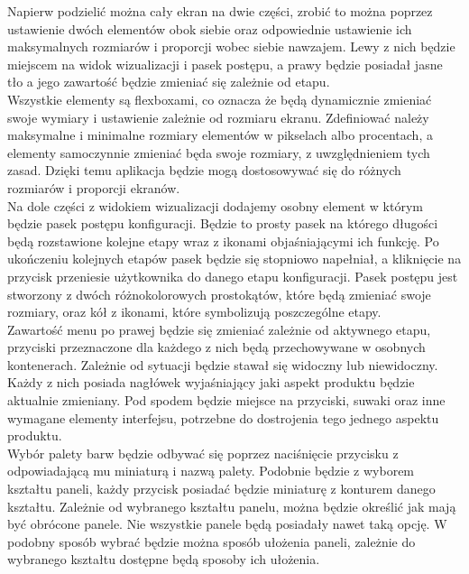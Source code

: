 \documentclass{article} %
\begin{document}
            Napierw podzielić można cały ekran na dwie części, zrobić to można poprzez ustawienie dwóch elementów obok siebie oraz odpowiednie ustawienie ich maksymalnych rozmiarów i proporcji wobec siebie nawzajem. Lewy z nich będzie miejscem na widok wizualizacji i pasek postępu, a prawy będzie posiadał jasne tło a jego zawartość będzie zmieniać się zależnie od etapu. 
            \\
            
            Wszystkie elementy są flexboxami, co oznacza że będą dynamicznie zmieniać swoje wymiary i ustawienie zależnie od rozmiaru ekranu. Zdefiniować należy maksymalne i minimalne rozmiary elementów w pikselach albo procentach, a elementy samoczynnie zmieniać będa swoje rozmiary, z uwzględnieniem tych zasad. Dzięki temu aplikacja będzie mogą dostosowywać się do różnych rozmiarów i proporcji ekranów.
            \\
            
            Na dole części z widokiem wizualizacji dodajemy osobny element w którym będzie pasek postępu konfiguracji. Będzie to prosty pasek na którego długości będą rozstawione kolejne etapy wraz z ikonami objaśniającymi ich funkcję. Po ukończeniu kolejnych etapów pasek będzie się stopniowo napełniał, a kliknięcie na przycisk przeniesie użytkownika do danego etapu konfiguracji. Pasek postępu jest stworzony z dwóch różnokolorowych prostokątów, które będą zmieniać swoje rozmiary, oraz kół z ikonami, które symbolizują poszczególne etapy.
            \\
            
            Zawartość menu po prawej będzie się zmieniać zależnie od aktywnego etapu, przyciski przeznaczone dla każdego z nich będą przechowywane w osobnych kontenerach. Zależnie od sytuacji będzie stawał się widoczny lub niewidoczny. Każdy z nich posiada nagłówek wyjaśniający jaki aspekt produktu będzie aktualnie zmieniany. Pod spodem będzie miejsce na przyciski, suwaki oraz inne wymagane elementy interfejsu, potrzebne do dostrojenia tego jednego aspektu produktu.
            \\
            
            Wybór palety barw będzie odbywać się poprzez naciśnięcie przycisku z odpowiadającą mu miniaturą i nazwą palety. Podobnie będzie z wyborem kształtu paneli, każdy przycisk posiadać będzie miniaturę z konturem danego kształtu. Zależnie od wybranego kształtu panelu, można będzie określić jak mają być obrócone panele. Nie wszystkie panele będą posiadały nawet taką opcję. W podobny sposób wybrać będzie można sposób ułożenia paneli, zależnie do wybranego kształtu dostępne będą sposoby ich ułożenia.
            \\
            
\end{document}
